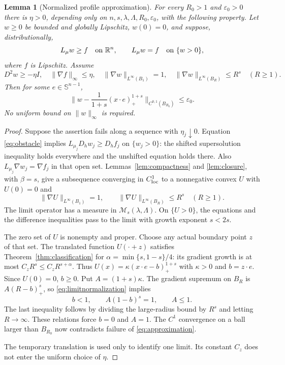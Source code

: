 \documentclass[11pt]{article}
\numberwithin{equation}{section}
\newtheorem{lemma}[theorem]{Lemma}
\theoremstyle{remark}
\newcommand{\R}{\mathbb R}
\newcommand{\Sph}{\mathbb S^{n-1}}
\newcommand{\norm}[1]{\lVert #1\rVert}
\newcommand{\M}{\mathcal M_{s}(\lambda,\Lambda)}
\begin{document}
\begin{lemma}[Normalized profile approximation]\label{lem:approximation}
For every $R_0>1$ and $\varepsilon_0>0$ there is $\eta>0$, depending only on $n,s,\lambda,\Lambda,R_0,\varepsilon_0$, with the following property. Let $w\ge0$ be bounded and globally Lipschitz, $w(0)=0$, and suppose, distributionally,
\begin{equation}\label{eq:obstacle}
 L_\mu w\ge f\quad\hbox{on }\R^n,
 \qquad L_\mu w=f\quad\hbox{on }\{w>0\},
\end{equation}
where $f$ is Lipschitz. Assume
\begin{equation}\label{eq:normalization}
 D^2w\ge-\eta I,\quad \norm{\nabla f}_\infty\le\eta,\quad
 \norm{\nabla w}_{L^\infty(B_1)}=1,\quad
 \norm{\nabla w}_{L^\infty(B_R)}\le R^s\quad(R\ge1).
\end{equation}
Then for some $e\in\Sph$,
\begin{equation}\label{eq:approximation}
 \norm{w-\frac1{1+s}(x\cdot e)_+^{1+s}}_{C^{0,1}(B_{R_0})}
 \le\varepsilon_0.
\end{equation}
No uniform bound on $\norm w_\infty$ is required.
\end{lemma}
\begin{proof}
Suppose the assertion fails along a sequence with $\eta_j\downarrow0$. Equation \eqref{eq:obstacle} implies
$L_{\mu_j}D_hw_j\ge D_hf_j$ on $\{w_j>0\}$: the shifted supersolution inequality holds everywhere and the unshifted equation holds there. Also $L_{\mu_j}\nabla w_j=\nabla f_j$ in that open set. Lemmas~\ref{lem:compactness} and \ref{lem:closure}, with $\beta=s$, give a subsequence converging in $C^1_{\rm loc}$ to a nonnegative convex $U$ with $U(0)=0$ and
\begin{equation}\label{eq:limitnormalization}
 \norm{\nabla U}_{L^\infty(B_1)}=1,\qquad
 \norm{\nabla U}_{L^\infty(B_R)}\le R^s\quad(R\ge1).
\end{equation}
The limit operator has a measure in $\M$. On $\{U>0\}$, the equations and the difference inequalities pass to the limit with growth exponent $s<2s$.

The zero set of $U$ is nonempty and proper. Choose any actual boundary point $z$ of that set. The translated function $U(\cdot+z)$ satisfies Theorem~\ref{thm:classification} for $\alpha=\min\{s,1-s\}/4$: its gradient growth is at most $C_zR^s\le C_zR^{s+\alpha}$. Thus
$U(x)=\kappa(x\cdot e-b)_+^{1+s}$ with $\kappa>0$ and $b=z\cdot e$. Since $U(0)=0$, $b\ge0$. Put $A=(1+s)\kappa$. The gradient supremum on $B_R$ is $A(R-b)_+^s$, so \eqref{eq:limitnormalization} implies
\[
 b<1,\qquad A(1-b)^s=1,\qquad A\le1.
\]
The last inequality follows by dividing the large-radius bound by $R^s$ and letting $R\to\infty$. These relations force $b=0$ and $A=1$. The $C^1$ convergence on a ball larger than $B_{R_0}$ now contradicts failure of \eqref{eq:approximation}.

The temporary translation is used only to identify one limit. Its constant $C_z$ does not enter the uniform choice of $\eta$.
\end{proof}
\end{document}
